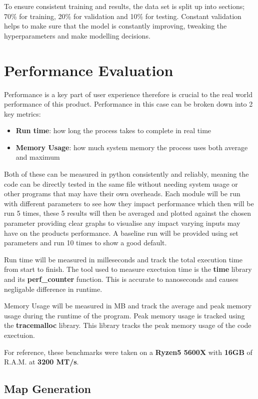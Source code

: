 \documentclass[final]{cmpreport_02}
\begin{document}
To ensure consistent training and results, the data set is split up into sections; 70\% for training, 20\% for validation and 10\% for testing.
Constant validation helps to make sure that the model is constantly improving, tweaking the hyperparameters and make modelling decisions.
\section{Performance Evaluation}
Performance is a key part of user experience therefore is crucial to the real world performance of this product.
Performance in this case can be broken down into 2 key metrics:

\begin{itemize}
    \item{\textbf{Run time}: how long the process takes to complete in real time}
    \item{\textbf{Memory Usage}: how much system memory the process uses both average and maximum}
\end{itemize}

Both of these can be measured in python consistently and reliably, meaning the code can be directly tested in the same file without needing system usage or other programs that may have their own overheads.
Each module will be run with different parameters to see how they impact performance which then will be run 5 times,
these 5 results will then be averaged and plotted against the chosen parameter providing clear graphs to visualise any impact varying inputs may have on the products performance.
A baseline run will be provided using set parameters and run 10 times to show a good default.

Run time will be measured in milleseconds and track the total execution time from start to finish. 
The tool used to measure exectuion time  is the \textbf{time} library and its \textbf{perf\_counter} function.
This is accurate to nanoseconds and causes negligable difference in runtime.

Memory Usage will be measured in MB and track the average and peak memory usage during the runtime of the program.
Peak memory usage is tracked using the \textbf{tracemalloc} library.
This library tracks the peak memory usage of the code exectuion.

For reference, these benchmarks were taken on a \textbf{Ryzen5 5600X} with \textbf{16GB} of R.A.M. at \textbf{3200 MT/s}.

\subsection{Map Generation}
\end{document}
